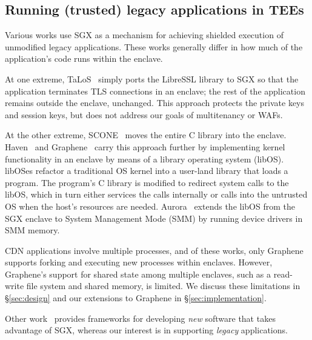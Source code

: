 



\subsection{Running (trusted) legacy applications in TEEs}


Various works use SGX as a mechanism for achieving shielded execution of
unmodified legacy applications.
%
These works generally differ in how much of the application's code runs
within the enclave.


At one extreme, TaLoS~\cite{talos} simply ports the LibreSSL library to SGX so
that the application terminates TLS connections in an enclave; the rest of
the application remains outside the enclave, unchanged.
%
This approach protects the private keys and session
keys, but does not address our goals of multitenancy or WAFs.


At the other extreme, SCONE~\cite{scone} moves the entire C library into the enclave.
%
Haven~\cite{haven} and Graphene~\cite{graphene} carry this approach further by
implementing kernel functionality in an enclave by means of a library operating
system (libOS).
libOSes refactor a traditional OS kernel into a user-land library that loads a
program.
%
The program's C library is modified to redirect system calls to the libOS, which
in turn either services the calls internally or calls into the untrusted OS
when the host's resources are needed.
%
Aurora~\cite{liang2018aurora} extends the libOS from the SGX enclave to System
Management Mode (SMM) by running device drivers in SMM memory.


CDN applications involve multiple processes, and of these works, only Graphene
supports forking and executing new processes within enclaves.
%
However, Graphene's support for shared state among multiple enclaves, such as a
read-write file system and shared memory, is limited.
%
We discuss these limitations in \S\ref{sec:design} and our extensions to
Graphene in \S\ref{sec:implementation}.


Other work~\cite{beekman2016improving} provides
frameworks for developing \emph{new} software that takes advantage of SGX,
whereas our interest is in supporting \emph{legacy} applications.

